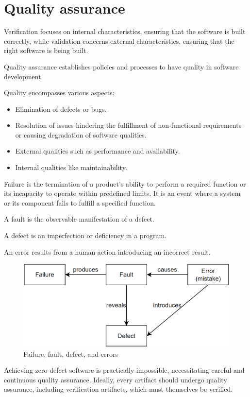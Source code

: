 \section{Quality assurance}

Verification focuses on internal characteristics, ensuring that the software is built correctly, while validation concerns external characteristics, ensuring that the right software is being built.
\begin{definition}
    Quality assurance establishes policies and processes to have quality in software development.
\end{definition}
Quality encompasses various aspects:
\begin{itemize}
    \item Elimination of defects or bugs.
    \item Resolution of issues hindering the fulfillment of non-functional requirements or causing degradation of software qualities.
    \item External qualities such as performance and availability.
    \item Internal qualities like maintainability.
\end{itemize}
\begin{definition}
    Failure is the termination of a product's ability to perform a required function or its incapacity to operate within predefined limits. 
    It is an event where a system or its component fails to fulfill a specified function.
\end{definition}
\begin{definition}
    A fault is the observable manifestation of a defect.
\end{definition}
\begin{definition}
    A defect is an imperfection or deficiency in a program.
\end{definition}
\begin{definition}
    An error results from a human action introducing an incorrect result.
\end{definition}
\begin{figure}[H]
    \centering
    \includegraphics[width=0.6\linewidth]{images/ver.png}
    \caption{Failure, fault, defect, and errors}
\end{figure}
Achieving zero-defect software is practically impossible, necessitating careful and continuous quality assurance. 
Ideally, every artifact should undergo quality assurance, including verification artifacts, which must themselves be verified.

